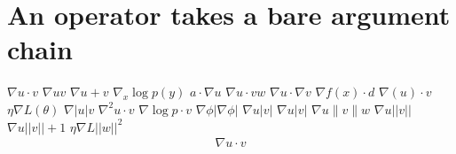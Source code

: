 \documentclass{article}
\begin{document}
\section{An operator takes a bare argument chain}
$\nabla u\cdot v$ $\nabla u v$ $\nabla u+v$ $\nabla_{x}\log p(y)$ $a\cdot\nabla u$
$\nabla u\cdot vw$ $\nabla u\cdot\nabla v$ $\nabla f(x)\cdot d$ $\nabla(u)\cdot v$ $\eta\nabla L(\theta)$
$\nabla|u|v$ $\nabla^{2}u\cdot v$ $\nabla\log p\cdot v$
$\nabla\phi\left|\nabla\phi\right|$ $\nabla u\left|v\right|$ $\nabla u\lvert v\rvert$ $\nabla u\|v\|w$
$\nabla u||v||$ $\nabla u||v||+1$ $\eta\nabla L||w||^{2}$
\[\begin{split}\nabla u\cdot v\end{split}\]
\end{document}
